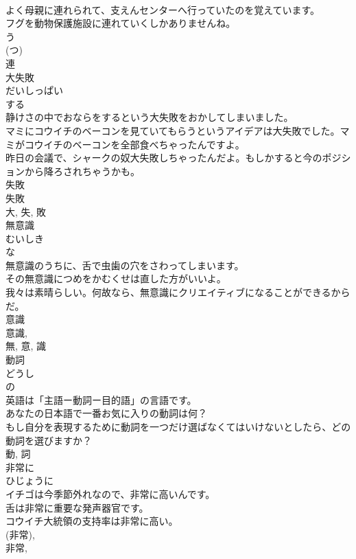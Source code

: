 \documentclass[8pt]{extreport}
\begin{document}
\begin{CJK}{UTF8}{min}
\\	よく母親に連れられて、支えんセンターへ行っていたのを覚えています。	
\\	フグを動物保護施設に連れていくしかありませんね。	
\\	う 
\\	(つ) 
\\	連	
\\	大失敗	
\\	だいしっぱい	
\\	する 
\\	静けさの中でおならをするという大失敗をおかしてしまいました。	
\\	マミにコウイチのベーコンを見ていてもらうというアイデアは大失敗でした。マミがコウイチのベーコンを全部食べちゃったんですよ。	
\\	昨日の会議で、シャークの奴大失敗しちゃったんだよ。もしかすると今のポジションから降ろされちゃうかも。	
\\	失敗 
\\	失敗 
\\	大, 失, 敗	
\\	無意識	
\\	むいしき	
\\	な 
\\	無意識のうちに、舌で虫歯の穴をさわってしまいます。	
\\	その無意識につめをかむくせは直した方がいいよ。	
\\	我々は素晴らしい。何故なら、無意識にクリエイティブになることができるからだ。	
\\	意識 
\\	意識, 
\\	無, 意, 識	
\\	動詞	
\\	どうし	
\\	の 
\\	英語は「主語ー動詞ー目的語」の言語です。	
\\	あなたの日本語で一番お気に入りの動詞は何？	
\\	もし自分を表現するために動詞を一つだけ選ばなくてはいけないとしたら、どの動詞を選びますか？	
\\	動, 詞	
\\	非常に	
\\	ひじょうに	
\\	イチゴは今季節外れなので、非常に高いんです。	
\\	舌は非常に重要な発声器官です。	
\\	コウイチ大統領の支持率は非常に高い。	
\\	(非常), 
\\	非常, 

\end{CJK}
\end{document}

